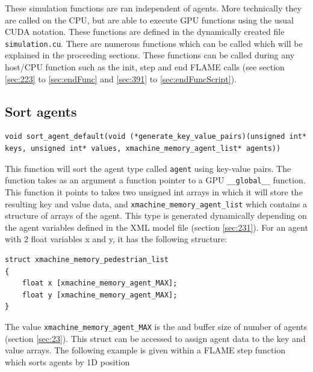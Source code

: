 \documentclass[11pt, a4paper, onecolumn, oneside]{report}
\begin{document}
These simulation functions are ran independent of agents. More technically they are called on the CPU, but are able to execute GPU functions using the usual CUDA notation. These functions are defined in the dynamically created file \texttt{simulation.cu}. There are numerous functions which can be called which will be explained in the proceeding sections. These functions can be called during any host/CPU function such as the init, step and end FLAME calls (see section \ref{sec:223} to \ref{sec:endFunc} and \ref{sec:391} to \ref{sec:endFuncScript}).

\subsection{Sort agents}

\begin{verbatim}
void sort_agent_default(void (*generate_key_value_pairs)(unsigned int* keys, unsigned int* values, xmachine_memory_agent_list* agents))
\end{verbatim}

This function will sort the agent type called \texttt{agent} using key-value pairs. The function takes as an argument a function pointer to a GPU \texttt{__global__} function. This function it points to takes two unsigned int arrays in which it will store the resulting key and value data, and \texttt{xmachine_memory_agent_list} which contains a structure of arrays of the agent. This type is generated dynamically depending on the agent variables defined in the XML model file (section \ref{sec:231}). For an agent with 2 float variables x and y, it has the following structure:

\begin{verbatim}
struct xmachine_memory_pedestrian_list 
{	
    float x [xmachine_memory_agent_MAX];
    float y [xmachine_memory_agent_MAX];
}
\end{verbatim}

The value \texttt{xmachine_memory_agent_MAX} is the and buffer size of number of agents (section \ref{sec:23}). This struct can be accessed to assign agent data to the key and value arrays. The following example is given within a FLAME step function which sorts agents by 1D position
\end{document}
